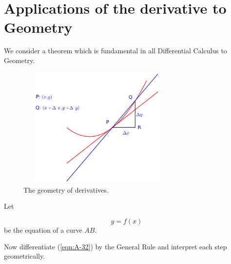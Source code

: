 \section{Applications of the derivative to Geometry} 
\label{sec:32}

We consider a theorem which is fundamental in all Differential Calculus to Geometry. 

\begin{figure}[h!]
\begin{minipage}{\textwidth}
\begin{center}
\includegraphics[height=6cm,width=8cm]{parabola-tangent.eps}
\end{center}
\end{minipage}
\caption{The geometry of derivatives.}
\label{fig:dg}
\end{figure}

Let

\begin{equation}
y = f(x)
\label{eqn:A-32}
\end{equation}
be the equation of a curve $AB$.

Now differentiate (\ref{eqn:A-32}) by the General Rule and interpret each step geometrically.

